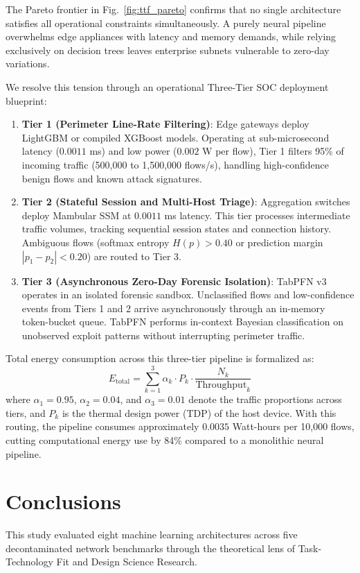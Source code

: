 \documentclass[10pt,a4paper]{article}
\begin{document}
The Pareto frontier in Fig.~\ref{fig:ttf_pareto} confirms that no single architecture satisfies all operational constraints simultaneously. A purely neural pipeline overwhelms edge appliances with latency and memory demands, while relying exclusively on decision trees leaves enterprise subnets vulnerable to zero-day variations.

We resolve this tension through an operational Three-Tier SOC deployment blueprint:
\begin{enumerate}
    \item \textbf{Tier 1 (Perimeter Line-Rate Filtering)}: Edge gateways deploy LightGBM or compiled XGBoost models. Operating at sub-microsecond latency ($0.0011$ ms) and low power ($0.002$ W per flow), Tier 1 filters 95\% of incoming traffic (500,000 to 1,500,000 flows/s), handling high-confidence benign flows and known attack signatures.
    \item \textbf{Tier 2 (Stateful Session and Multi-Host Triage)}: Aggregation switches deploy Mambular SSM at $0.0011$ ms latency. This tier processes intermediate traffic volumes, tracking sequential session states and connection history. Ambiguous flows (softmax entropy $H(p) > 0.40$ or prediction margin $|p_1 - p_2| < 0.20$) are routed to Tier 3.
    \item \textbf{Tier 3 (Asynchronous Zero-Day Forensic Isolation)}: TabPFN v3 operates in an isolated forensic sandbox. Unclassified flows and low-confidence events from Tiers 1 and 2 arrive asynchronously through an in-memory token-bucket queue. TabPFN performs in-context Bayesian classification on unobserved exploit patterns without interrupting perimeter traffic.
\end{enumerate}

Total energy consumption across this three-tier pipeline is formalized as:
\begin{equation}
E_{\text{total}} = \sum_{k=1}^3 \alpha_k \cdot P_k \cdot \frac{N_k}{\text{Throughput}_k}
\end{equation}
where $\alpha_1 = 0.95$, $\alpha_2 = 0.04$, and $\alpha_3 = 0.01$ denote the traffic proportions across tiers, and $P_k$ is the thermal design power (TDP) of the host device. With this routing, the pipeline consumes approximately $0.0035$ Watt-hours per 10,000 flows, cutting computational energy use by 84\% compared to a monolithic neural pipeline.

\section{Conclusions}
This study evaluated eight machine learning architectures across five decontaminated network benchmarks through the theoretical lens of Task-Technology Fit and Design Science Research.
\end{document}
